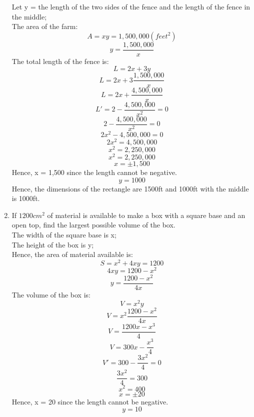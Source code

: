 \documentclass[12pt]{article}
\begin{document}
\begin{enumerate}
    Let y = the length of the two sides of the fence and the length of the fence in the middle;\\
    The area of the farm:
    \[A = xy = 1,500,000 (feet^2)\]
    \[y = \frac{1,500,000}{x}\]
    The total length of the fence is:
    \[L = 2x + 3y\]
    \[L = 2x + 3\frac{1,500,000}{x}\]
    \[L = 2x + \frac{4,500,000}{x}\]
    \[L' = 2 - \frac{4,500,000}{x^2} = 0\]
    \[2 - \frac{4,500,000}{x^2} = 0\]
    \[2x^2 - 4,500,000 = 0\]
    \[2x^2 = 4,500,000\]
    \[x^2 = 2,250,000\]
    \[x^2 = 2,250,000\]
    \[x = \pm 1,500\]
    Hence, x = 1,500 since the length cannot be negative.
    \[y = 1000\]
    Hence, the dimensions of the rectangle are 1500ft and 1000ft with the middle is 1000ft.
    \setcounter{enumi}{18}
    \item If $1200cm^2$ of material is available to make a box with a square base and an open top, find the largest possible volume of the box.\\
    The width of the square base is x;\\
    The height of the box is y;\\
    Hence, the area of material available is:
    \[S = x^2 + 4xy = 1200\]
    \[4xy = 1200 - x^2\]
    \[y = \frac{1200 - x^2}{4x}\]
    The volume of the box is:
    \[V = x^2y\]
    \[V = x^2\frac{1200 - x^2}{4x}\] 
    \[V = \frac{1200x - x^3}{4}\] 
    \[V = 300x - \frac{x^3}{4}\] 
    \[V' = 300 - \frac{3x^2}{4} = 0\] 
    \[\frac{3x^2}{4} = 300\]
    \[x^2 = 400\]
    \[x = \pm 20\]
    Hence, x = 20 since the length cannot be negative.
    \[y = 10\]
    


\end{enumerate}
\end{document}
